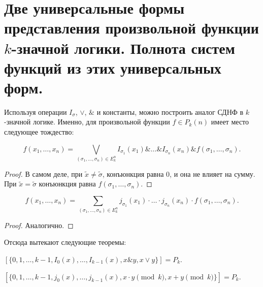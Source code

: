 \section{Две универсальные формы представления произвольной функции $k$-значной логики. Полнота систем функций из этих универсальных форм.}

Используя операции $I_\sigma$, $\vee$, $\&$ и константы, можно построить аналог СДНФ в $k$-значной логике. Именно, для произвольной функции $f \in P_k(n)$ имеет место следующее тождество:
\begin{theorem}
    \[
        f(x_1, \ldots, x_n) = \bigvee_{(\sigma_1, \ldots, \sigma_n) \in E_k^n}I_{\sigma_1}(x_1) \& \ldots \& I_{\sigma_n}(x_n) \& f(\sigma_1, \ldots, \sigma_n).
    \]
\end{theorem}
\begin{proof}
    В самом деле, при $\widetilde{x} \neq \widetilde{\sigma}$, конъюнкция равна 0, и она не влияет на сумму. При $\widetilde{x} = \widetilde{\sigma}$ конъюнкция равна $f(\sigma_1, \ldots, \sigma_n)$.
\end{proof}

\begin{theorem}
    \[
        f(x_1, \ldots, x_n) = \sum_{(\sigma_1, \ldots, \sigma_n) \in E^n_k} j_{\sigma_1}(x_1)\cdot \ldots \cdot j_{\sigma_n}(x_n) \cdot f(\sigma_1, \ldots, \sigma_n).
    \]
\end{theorem}

\begin{proof}
    Аналогично.
\end{proof}

Отсюда вытекают следующие теоремы:
\begin{theorem}
    $[\{0, 1, \ldots, k-1, I_0(x), \ldots, I_{k-1}(x), x\& y, x\vee y\}] = P_k$.
\end{theorem}
\begin{theorem}
    $[\{0, 1, \ldots, k-1, j_0(x), \ldots, j_{k-1}(x), x\cdot y \pmod k, x+y \pmod k\}] = P_k$.
\end{theorem}
